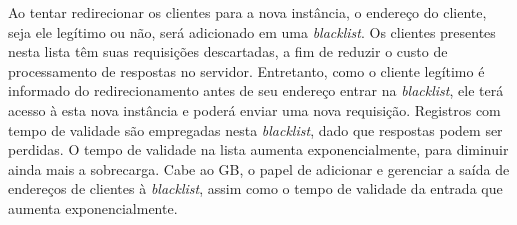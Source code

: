 Ao tentar redirecionar os clientes para a nova instância, o endereço do cliente, seja ele legítimo ou não, será adicionado em uma \emph{blacklist}. Os clientes presentes nesta lista têm suas requisições descartadas, a fim de reduzir o custo de processamento de respostas no servidor. Entretanto, como o cliente legítimo é informado do redirecionamento antes de seu endereço entrar na \emph{blacklist}, ele terá acesso à esta nova instância e poderá enviar uma nova requisição. Registros com tempo de validade são empregadas nesta \emph{blacklist}, dado que respostas podem ser perdidas. O tempo de validade na lista aumenta exponencialmente, para diminuir ainda mais a sobrecarga. Cabe ao GB, o papel de adicionar e gerenciar a saída de endereços de clientes à \emph{blacklist}, assim como o tempo de validade da entrada que aumenta exponencialmente.


% 
% 
